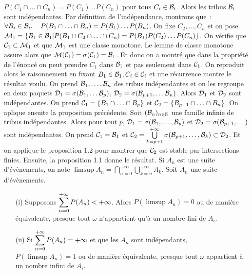 $P(C_1\cap\ldots\cap C_n) = P(C_1)\ldots P(C_n)$ pour tous $C_i\in\mathcal{B}_i$. Alors les tribus 
$\mathcal{B}_i$ sont indépendantes.
\dem Par définition de l'indépendance, montrons que~: 
$\forall B_i\in\mathcal{B}_i,\quad P(B_1\cap\ldots\cap B_n) = P(B_1)\ldots P(B_n)$. 
On fixe $C_2,\ldots,C_n$ et on pose 
$\mathcal{M}_1 = \{B_1\in\mathcal{B}_1|P(B_1\cap C_2\cap\ldots\cap C_n) = P(B_1)P(C_2)\ldots P(C_n)\}$.
On vérifie que $\mathcal{C}_1\subset \mathcal{M}_1$ et que $\mathcal{M}_1$ est une classe monotone. Le lemme de classe
monotone assure alors que $\mathcal{M}(\mathcal{C}_1) = \sigma(\mathcal{C}_1) = \mathcal{B}_1$. Et donc on a montré
que dans la propriété de l'énoncé on peut prendre $C_1$ dans $\mathcal{B}_1$ et pas seulement dans 
$\mathcal{C}_1$. On reproduit alors le raisonnement en fixant $B_1\in\mathcal{B}_1, C_i\in\mathcal{C}_i$ et
une récurrence montre le résultat voulu.\findem
\proposition On prend $\mathcal{B}_1,\ldots,\mathcal{B}_n$ des tribus indépendantes et on les regroupe en deux paquets
$\mathcal{D}_1 = \sigma(\mathcal{B}_1, \ldots\mathcal{B}_p)$, $\mathcal{D}_2 = \sigma(\mathcal{B}_{p+1},\ldots \mathcal{B}_n)$.
Alors $\mathcal{D}_1$ et $\mathcal{D}_2$ sont indépendantes.
\dem On prend $\mathcal{C}_1 = \{B_1\cap\ldots\cap B_p\}$ et $\mathcal{C}_2 = \{B_{p+1}\cap\ldots\cap B_n\}$.
On aplique ensuite la proposition précédente.\findem
\proposition Soit $(\mathcal{B}_n)_{n\in\mathbb{N}}$ une famille infinie de tribus indépendantes. Alors pour tout
$p$, $\mathcal{D}_1 = \sigma(\mathcal{B}_1, \ldots, \mathcal{B}_p)$ et $\mathcal{D}_2 = \sigma(\mathcal{B}_{p+1},\ldots)$ sont 
indépendantes.
\dem On prend $\mathcal{C}_1 = \mathcal{B}_1$ et $\mathcal{C}_2 = \bigcup\limits_{k=p+1}^{+\infty}\sigma(
                                                     \mathcal{B}_{p+1},\ldots,\mathcal{B}_k)\subset\mathcal{D}_2$.
Et on applique le proposition 1.2 pour montrer que $\mathcal{C}_2$ est stable par intersections finies.
Ensuite, la proposition 1.1 donne le résultat.\findem
{} Si $A_n$ est une suite d'évènements, on note 
$\limsup A_n = \bigcap\limits_{n=0}^{+\infty}\bigcup\limits_{k=n}^{+\infty}A_k$.
Soit $A_n$ une suite d'évènements.
\begin{itemize}
\item[(i)]{} Supposons ${\displaystyle \sum_{n=0}^{+\infty}{P(A_n)}}<+\infty$. Alors $P(\limsup A_n) = 0$ ou de
manière équivalente, presque tout $\omega$ n'appartient qu'à un nombre fini de $A_i$.
\item[(ii)]{} Si ${\displaystyle \sum_{n=0}^{+\infty}{P(A_n)}}=+\infty$ et que les $A_n$ sont indépendants, 
$P(\limsup A_n) = 1$ ou de manière équivalente, presque tout $\omega$ appartient à un nombre infini
de $A_i$.
\end{itemize}
